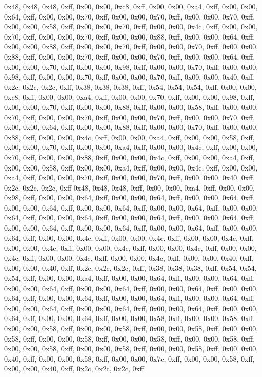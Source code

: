 0x48, 0x48, 0x48, 0xff, 0x00, 0x00, 0xc8, 0xff, 0x00, 0x00, 0xa4, 0xff, 0x00, 0x00, 0x64, 0xff, 0x00, 0x00, 0x70, 0xff, 0x00, 0x00, 0x70, 0xff, 0x00, 0x00, 0x70, 0xff, 0x00, 0x00, 0x58, 0xff, 0x00, 0x00, 0x70, 0xff, 0x00, 0x00, 0x4c, 0xff, 0x00, 0x00, 0x70, 0xff, 0x00, 0x00, 0x70, 0xff, 0x00, 0x00, 0x88, 0xff, 0x00, 0x00, 0x64, 0xff, 0x00, 0x00, 0x88, 0xff, 0x00, 0x00, 0x70, 0xff, 0x00, 0x00, 0x70, 0xff, 0x00, 0x00, 0x88, 0xff, 0x00, 0x00, 0x70, 0xff, 0x00, 0x00, 0x70, 0xff, 0x00, 0x00, 0x64, 0xff, 0x00, 0x00, 0x70, 0xff, 0x00, 0x00, 0x98, 0xff, 0x00, 0x00, 0x70, 0xff, 0x00, 0x00, 0x98, 0xff, 0x00, 0x00, 0x70, 0xff, 0x00, 0x00, 0x70, 0xff, 0x00, 0x00, 0x40, 0xff, 0x2c, 0x2c, 0x2c, 0xff, 0x38, 0x38, 0x38, 0xff, 0x54, 0x54, 0x54, 0xff, 0x00, 0x00, 0xc8, 0xff, 0x00, 0x00, 0xa4, 0xff, 0x00, 0x00, 0x70, 0xff, 0x00, 0x00, 0x98, 0xff, 0x00, 0x00, 0x70, 0xff, 0x00, 0x00, 0x88, 0xff, 0x00, 0x00, 0x58, 0xff, 0x00, 0x00, 0x70, 0xff, 0x00, 0x00, 0x70, 0xff, 0x00, 0x00, 0x70, 0xff, 0x00, 0x00, 0x70, 0xff, 0x00, 0x00, 0x64, 0xff, 0x00, 0x00, 0x88, 0xff, 0x00, 0x00, 0x70, 0xff, 0x00, 0x00, 0x88, 0xff, 0x00, 0x00, 0x4c, 0xff, 0x00, 0x00, 0xa4, 0xff, 0x00, 0x00, 0x58, 0xff, 0x00, 0x00, 0x70, 0xff, 0x00, 0x00, 0xa4, 0xff, 0x00, 0x00, 0x4c, 0xff, 0x00, 0x00, 0x70, 0xff, 0x00, 0x00, 0x88, 0xff, 0x00, 0x00, 0x4c, 0xff, 0x00, 0x00, 0xa4, 0xff, 0x00, 0x00, 0x58, 0xff, 0x00, 0x00, 0xa4, 0xff, 0x00, 0x00, 0x4c, 0xff, 0x00, 0x00, 0xa4, 0xff, 0x00, 0x00, 0x70, 0xff, 0x00, 0x00, 0x70, 0xff, 0x00, 0x00, 0x40, 0xff, 0x2c, 0x2c, 0x2c, 0xff
0x48, 0x48, 0x48, 0xff, 0x00, 0x00, 0xa4, 0xff, 0x00, 0x00, 0x98, 0xff, 0x00, 0x00, 0x64, 0xff, 0x00, 0x00, 0x64, 0xff, 0x00, 0x00, 0x64, 0xff, 0x00, 0x00, 0x64, 0xff, 0x00, 0x00, 0x64, 0xff, 0x00, 0x00, 0x64, 0xff, 0x00, 0x00, 0x64, 0xff, 0x00, 0x00, 0x64, 0xff, 0x00, 0x00, 0x64, 0xff, 0x00, 0x00, 0x64, 0xff, 0x00, 0x00, 0x64, 0xff, 0x00, 0x00, 0x64, 0xff, 0x00, 0x00, 0x64, 0xff, 0x00, 0x00, 0x64, 0xff, 0x00, 0x00, 0x4c, 0xff, 0x00, 0x00, 0x4c, 0xff, 0x00, 0x00, 0x4c, 0xff, 0x00, 0x00, 0x4c, 0xff, 0x00, 0x00, 0x4c, 0xff, 0x00, 0x00, 0x4c, 0xff, 0x00, 0x00, 0x4c, 0xff, 0x00, 0x00, 0x4c, 0xff, 0x00, 0x00, 0x4c, 0xff, 0x00, 0x00, 0x40, 0xff, 0x00, 0x00, 0x40, 0xff, 0x2c, 0x2c, 0x2c, 0xff, 0x38, 0x38, 0x38, 0xff, 0x54, 0x54, 0x54, 0xff, 0x00, 0x00, 0xa4, 0xff, 0x00, 0x00, 0x64, 0xff, 0x00, 0x00, 0x64, 0xff, 0x00, 0x00, 0x64, 0xff, 0x00, 0x00, 0x64, 0xff, 0x00, 0x00, 0x64, 0xff, 0x00, 0x00, 0x64, 0xff, 0x00, 0x00, 0x64, 0xff, 0x00, 0x00, 0x64, 0xff, 0x00, 0x00, 0x64, 0xff, 0x00, 0x00, 0x64, 0xff, 0x00, 0x00, 0x64, 0xff, 0x00, 0x00, 0x64, 0xff, 0x00, 0x00, 0x64, 0xff, 0x00, 0x00, 0x64, 0xff, 0x00, 0x00, 0x58, 0xff, 0x00, 0x00, 0x58, 0xff, 0x00, 0x00, 0x58, 0xff, 0x00, 0x00, 0x58, 0xff, 0x00, 0x00, 0x58, 0xff, 0x00, 0x00, 0x58, 0xff, 0x00, 0x00, 0x58, 0xff, 0x00, 0x00, 0x58, 0xff, 0x00, 0x00, 0x58, 0xff, 0x00, 0x00, 0x58, 0xff, 0x00, 0x00, 0x58, 0xff, 0x00, 0x00, 0x58, 0xff, 0x00, 0x00, 0x40, 0xff, 0x00, 0x00, 0x58, 0xff, 0x00, 0x00, 0x7c, 0xff, 0x00, 0x00, 0x58, 0xff, 0x00, 0x00, 0x40, 0xff, 0x2c, 0x2c, 0x2c, 0xff
